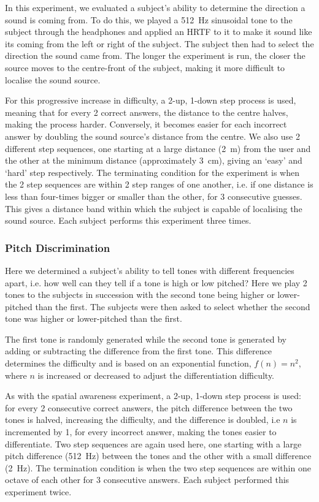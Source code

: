 \documentclass[format=sigconf, review=true, screen=true, anonymous=true]{acmart}
\begin{document}
In this experiment, we evaluated a subject's ability to determine the direction a sound is coming from. To do this, we played a \SI{512}{\hertz} sinusoidal tone to the subject through the headphones and applied an HRTF to it to make it sound like its coming from the left or right of the subject. The subject then had to select the direction the sound came from. The longer the experiment is run, the closer the source moves to the centre-front of the subject, making it more difficult to localise the sound source. 

For this progressive increase in difficulty, a 2-up, 1-down step process is used, meaning that for every 2 correct answers, the distance to the centre halves, making the process harder. Conversely, it becomes easier for each incorrect answer by doubling the sound source's distance from the centre. We also use 2 different step sequences, one starting at a large distance (\SI{2}{\m}) from the user and the other at the minimum distance (approximately \SI{3}{\cm}), giving an `easy' and `hard' step respectively. The terminating condition for the experiment is when the 2 step sequences are within 2 step ranges of one another, i.e. if one distance is less than four-times bigger or smaller than the other, for 3 consecutive guesses. This gives a distance band within which the subject is capable of localising the sound source. Each subject performs this experiment three times. 

\subsubsection{Pitch Discrimination}

Here we determined a subject's ability to tell tones with different frequencies apart, i.e. how well can they tell if a tone is high or low pitched? Here we play 2 tones to the subjects in succession with the second tone being higher or lower-pitched than the first. The subjects were then asked to select whether the second tone was higher or lower-pitched than the first.

The first tone is randomly generated while the second tone is generated by adding or subtracting the difference from the first tone. This difference determines the difficulty and is based on an exponential function, $f(n) = n^2$, where $n$ is increased or decreased to adjust the differentiation difficulty. 

As with the spatial awareness experiment, a 2-up, 1-down step process is used: for every 2 consecutive correct answers, the pitch difference between the two tones is halved, increasing the difficulty, and the difference is doubled, i.e $n$ is incremented by 1, for every incorrect answer, making the tones easier to differentiate. Two step sequences are again used here, one starting with a large pitch difference (\SI{512}{\hertz}) between the tones and the other with a small difference (\SI{2}{\hertz}). The termination condition is when the two step sequences are within one octave of each other for 3 consecutive answers. Each subject performed this experiment twice. 
\end{document}
